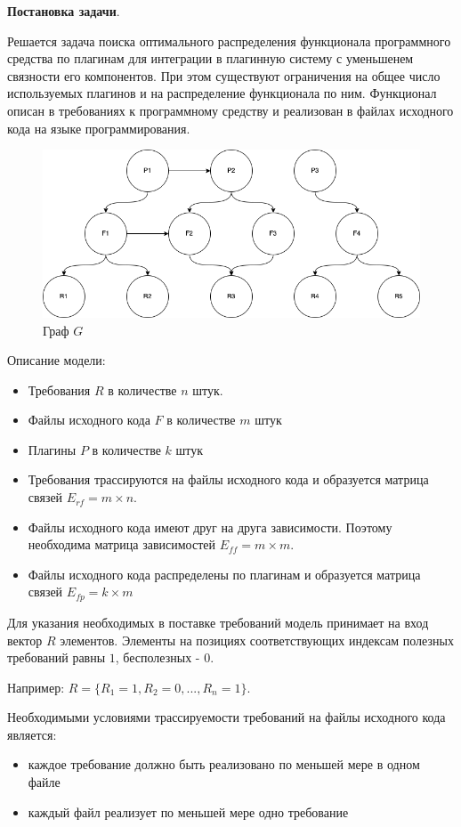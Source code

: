 \documentclass{article}
\begin{document}
  \textbf{Постановка задачи}.

  Решается задача поиска оптимального распределения функционала программного средства по плагинам для интеграции в плагинную систему с уменьшенем связности его компонентов. При этом существуют ограничения на общее число используемых плагинов и на распределение функционала по ним. Функционал описан в требованиях к программному средству и реализован в файлах исходного кода на языке программирования.

  \begin{figure}[H]
      \centering
      \includegraphics[width=1\textwidth]{Исходный граф.drawio}
      \caption{Граф $G$}
  \end{figure}

  Описание модели:
  \begin{itemize}
    \item Требования $R$ в количестве $n$ штук.
    \item Файлы исходного кода $F$ в количестве $m$ штук
    \item Плагины $P$ в количестве $k$ штук
    \item Требования трассируются на файлы исходного кода и образуется матрица связей $E_{rf} = m \times n$.
    \item Файлы исходного кода имеют друг на друга зависимости. Поэтому необходима матрица зависимостей $E_{ff} = m \times m$.
    \item Файлы исходного кода распределены по плагинам и образуется матрица связей $E_{fp} = k \times m$
  \end{itemize}

  Для указания необходимых в поставке требований модель принимает на вход вектор $R$ элементов. Элементы на позициях соответствующих индексам полезных требований равны $1$, бесполезных - $0$.

  Например: $R = \{R_1 = 1, R_2 = 0, ..., R_n = 1\}$.

  Необходимыми условиями трассируемости требований на файлы исходного кода является:
  \begin{itemize}
    \item каждое требование должно быть реализовано по меньшей мере в одном файле
    \item каждый файл реализует по меньшей мере одно требование
  \end{itemize}
\end{document}
